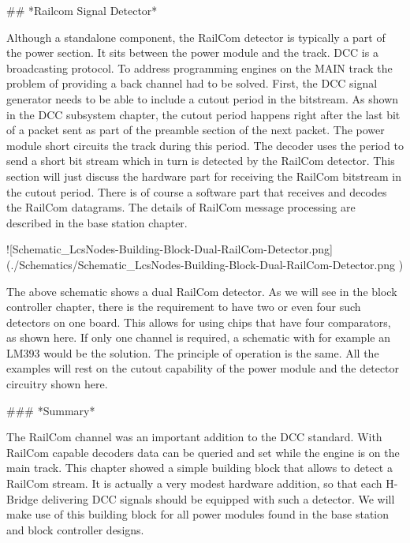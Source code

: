 ## *Railcom Signal Detector*

Although a standalone component, the RailCom detector is typically a part of the power section. It sits between the power module and the track. DCC is a broadcasting protocol. To address programming engines on the MAIN track the problem of providing a back channel had to be solved. First, the DCC signal generator needs to be able to include a cutout period in the bitstream. As shown in the DCC subsystem chapter, the cutout period happens right after the last bit of a packet sent as part of the preamble section of the next packet. The power module short circuits the track during this period. The decoder uses the period to send a short bit stream which in turn is detected by the RailCom detector. This section will just discuss the hardware part for receiving the RailCom bitstream in the cutout period. There is of course a software part that receives and decodes the RailCom datagrams. The details of RailCom message processing are described in the base station chapter.

![Schematic_LcsNodes-Building-Block-Dual-RailCom-Detector.png](./Schematics/Schematic_LcsNodes-Building-Block-Dual-RailCom-Detector.png )

The above schematic shows a dual RailCom detector. As we will see in the block controller chapter, there is the requirement to have two or even four such detectors on one board. This allows for using chips that have four comparators, as shown here. If only one channel is required, a schematic with for example an LM393 would be the solution. The principle of operation is the same. All the examples will rest on the cutout capability of the power module and the detector circuitry shown here.

### *Summary*

The RailCom channel was an important addition to the DCC standard. With RailCom capable decoders data can be queried and set while the engine is on the main track. This chapter showed a simple building block that allows to detect a RailCom stream. It is actually a very modest hardware addition, so that each H-Bridge delivering DCC signals should be equipped with such a detector. We will make use of this building block for all power modules found in the base station and block controller designs.
